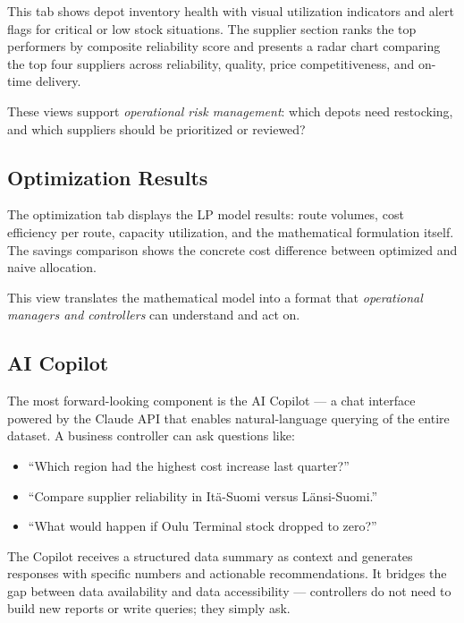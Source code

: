 \documentclass[11pt,a4paper]{article}
\begin{document}
This tab shows depot inventory health with visual utilization indicators and alert flags for critical or low stock situations. The supplier section ranks the top performers by composite reliability score and presents a radar chart comparing the top four suppliers across reliability, quality, price competitiveness, and on-time delivery.

These views support \textit{operational risk management}: which depots need restocking, and which suppliers should be prioritized or reviewed?

\subsection{Optimization Results}

The optimization tab displays the LP model results: route volumes, cost efficiency per route, capacity utilization, and the mathematical formulation itself. The savings comparison shows the concrete cost difference between optimized and naive allocation.

This view translates the mathematical model into a format that \textit{operational managers and controllers} can understand and act on.

\subsection{AI Copilot}

The most forward-looking component is the AI Copilot --- a chat interface powered by the Claude API that enables natural-language querying of the entire dataset. A business controller can ask questions like:

\begin{itemize}[leftmargin=2em]
    \item ``Which region had the highest cost increase last quarter?''
    \item ``Compare supplier reliability in Itä-Suomi versus Länsi-Suomi.''
    \item ``What would happen if Oulu Terminal stock dropped to zero?''
\end{itemize}

The Copilot receives a structured data summary as context and generates responses with specific numbers and actionable recommendations. It bridges the gap between data availability and data accessibility --- controllers do not need to build new reports or write queries; they simply ask.


\end{document}
